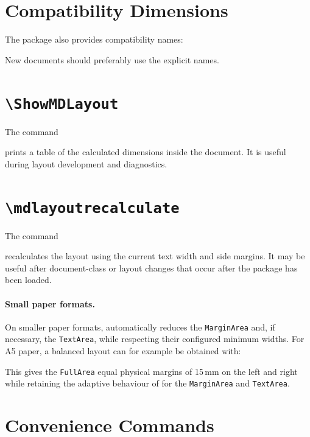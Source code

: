 \documentclass[
11pt,
a4paper,
oneside
]{scrbook}
\begin{document}
\section{Compatibility Dimensions}

The package also provides compatibility names:




New documents should preferably use the explicit  names.

\section{\texttt{\textbackslash ShowMDLayout}}

The command




prints a table of the calculated dimensions inside the document.
It is useful during layout development and diagnostics.

\section{\texttt{\textbackslash mdlayoutrecalculate}}

The command




recalculates the layout using the current text width and side margins.
It may be useful after document-class or layout changes that occur after the
package has been loaded.

\paragraph{Small paper formats.}
On smaller paper formats, \MDWordmark automatically reduces the
\texttt{MarginArea} and, if necessary, the \texttt{TextArea}, while
respecting their configured minimum widths.
For A5 paper, a balanced layout can for example be obtained with:




This gives the \texttt{FullArea} equal physical margins of 15\,mm on
the left and right while retaining the adaptive behaviour of
\MDWordmark for the \texttt{MarginArea} and \texttt{TextArea}.

\section{Convenience Commands}
\end{document}
